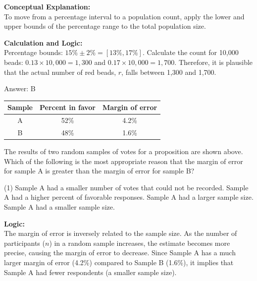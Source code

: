 \documentclass[11pt,paper=a4,answers]{exam}
\begin{document}
\begin{questions}
\begin{solution}
\textbf{Conceptual Explanation:} \\
To move from a percentage interval to a population count, apply the lower and upper bounds of the percentage range to the total population size.

\vspace{30pt}

\textbf{Calculation and Logic:} \\
Percentage bounds: $15\% \pm 2\% = [13\%, 17\%]$. Calculate the count for 10,000 beads: $0.13 \times 10,000 = 1,300$ and $0.17 \times 10,000 = 1,700$. Therefore, it is plausible that the actual number of red beads, $r$, falls between 1,300 and 1,700.

\vspace{30pt}

Answer: \colorbox{yellow!100}{B}
\end{solution}

\vspace{60pt}

\question
\begin{center}
\begin{tabular}{|c|c|c|}
\hline
Sample & Percent in favor & Margin of error \\ \hline
A & 52\% & 4.2\% \\ \hline
B & 48\% & 1.6\% \\ \hline
\end{tabular}
\end{center}
The results of two random samples of votes for a proposition are shown above. Which of the following is the most appropriate reason that the margin of error for sample A is greater than the margin of error for sample B?
\begin{tasks}(1)
    \task Sample A had a smaller number of votes that could not be recorded.
    \task Sample A had a higher percent of favorable responses.
    \task Sample A had a larger sample size.
    \task Sample A had a smaller sample size.
\end{tasks}

\begin{solution}
\textbf{Logic:} \\
The margin of error is inversely related to the sample size. As the number of participants ($n$) in a random sample increases, the estimate becomes more precise, causing the margin of error to decrease. Since Sample A has a much larger margin of error (4.2\%) compared to Sample B (1.6\%), it implies that Sample A had fewer respondents (a smaller sample size).


\end{solution}
\end{questions}
\end{document}

